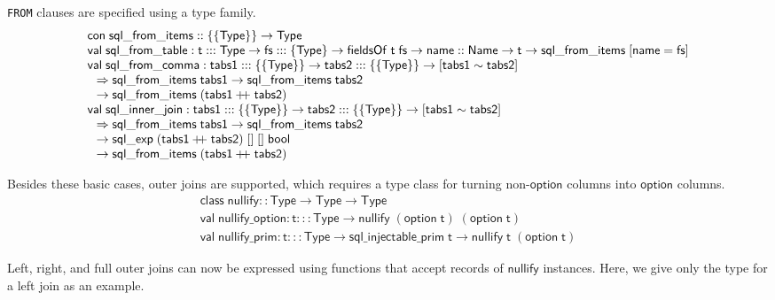 \documentclass{article}
\newcommand{\mt}[1]{\mathsf{#1}}
\newcommand{\rc}{+ \hspace{-.075in} + \;}
\begin{document}
\texttt{FROM} clauses are specified using a type family.
$$\begin{array}{l}
  \mt{con} \; \mt{sql\_from\_items} :: \{\{\mt{Type}\}\} \to \mt{Type} \\
  \mt{val} \; \mt{sql\_from\_table} : \mt{t} ::: \mt{Type} \to \mt{fs} ::: \{\mt{Type}\} \to \mt{fieldsOf} \; \mt{t} \; \mt{fs} \to \mt{name} :: \mt{Name} \to \mt{t} \to \mt{sql\_from\_items} \; [\mt{name} = \mt{fs}] \\
  \mt{val} \; \mt{sql\_from\_comma} : \mt{tabs1} ::: \{\{\mt{Type}\}\} \to \mt{tabs2} ::: \{\{\mt{Type}\}\} \to [\mt{tabs1} \sim \mt{tabs2}] \\
  \hspace{.1in} \Rightarrow \mt{sql\_from\_items} \; \mt{tabs1} \to \mt{sql\_from\_items} \; \mt{tabs2} \\
  \hspace{.1in} \to \mt{sql\_from\_items} \; (\mt{tabs1} \rc \mt{tabs2}) \\
  \mt{val} \; \mt{sql\_inner\_join} : \mt{tabs1} ::: \{\{\mt{Type}\}\} \to \mt{tabs2} ::: \{\{\mt{Type}\}\} \to [\mt{tabs1} \sim \mt{tabs2}] \\
  \hspace{.1in} \Rightarrow \mt{sql\_from\_items} \; \mt{tabs1} \to \mt{sql\_from\_items} \; \mt{tabs2} \\
  \hspace{.1in} \to \mt{sql\_exp} \; (\mt{tabs1} \rc \mt{tabs2}) \; [] \; [] \; \mt{bool} \\
  \hspace{.1in} \to \mt{sql\_from\_items} \; (\mt{tabs1} \rc \mt{tabs2})
\end{array}$$

Besides these basic cases, outer joins are supported, which requires a type class for turning non-$\mt{option}$ columns into $\mt{option}$ columns.
$$\begin{array}{l}
  \mt{class} \; \mt{nullify} :: \mt{Type} \to \mt{Type} \to \mt{Type} \\
  \mt{val} \; \mt{nullify\_option} : \mt{t} ::: \mt{Type} \to \mt{nullify} \; (\mt{option} \; \mt{t}) \; (\mt{option} \; \mt{t}) \\
  \mt{val} \; \mt{nullify\_prim} : \mt{t} ::: \mt{Type} \to \mt{sql\_injectable\_prim} \; \mt{t} \to \mt{nullify} \; \mt{t} \; (\mt{option} \; \mt{t})
\end{array}$$

Left, right, and full outer joins can now be expressed using functions that accept records of $\mt{nullify}$ instances.  Here, we give only the type for a left join as an example.
\end{document}

